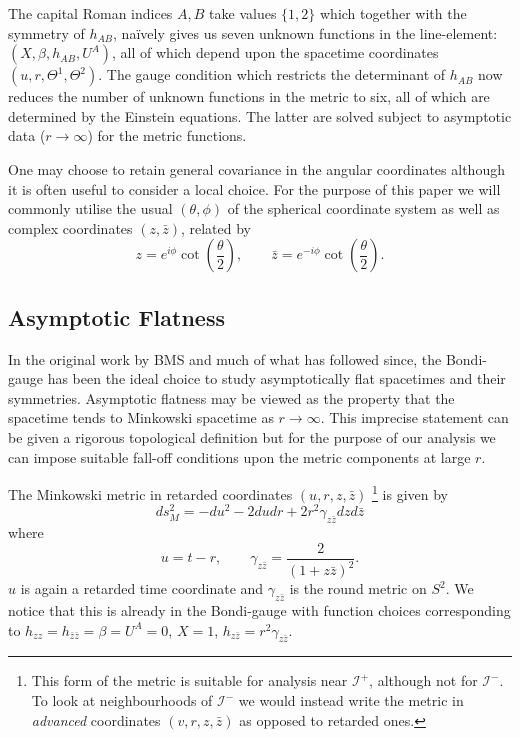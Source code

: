 \documentclass[a4paper,11pt]{article}
\numberwithin{equation}{section}
\begin{document}
The capital Roman indices $A,B$ take values $\{1,2\}$ which together with the symmetry of $h_{AB}$, na\"{i}vely gives us seven unknown functions in the line-element: $(X, \beta, h_{AB}, U^A)$, all of which depend upon the spacetime coordinates $(u, r, \Theta^1, \Theta^2)$. The gauge condition which restricts the determinant of $h_{AB}$ now reduces the number of unknown functions in the metric to six, all of which are determined by the Einstein equations. The latter are solved subject to asymptotic data ($ r \rightarrow \infty$) for the metric functions.  

One may choose to retain general covariance in the angular coordinates \cite{Flanagan:2015pxa} although it is often useful to consider a local choice. For the purpose of this paper we will commonly utilise the usual $(\theta, \phi)$ of the spherical coordinate system as well as complex coordinates  $(z, \bar{z})$, related by
\begin{equation}
z=e^{i\phi}\cot\left(\frac{\theta}{2}\right), \qquad \bar{z}=e^{-i\phi}\cot\left(\frac{\theta}{2}\right).
\end{equation}

\subsection{Asymptotic Flatness}

In the original work by BMS and much of what has followed since, the Bondi-gauge has been the ideal choice to study asymptotically flat spacetimes and their symmetries. Asymptotic flatness may be viewed as the property that the spacetime tends to Minkowski spacetime as $r \rightarrow \infty$. This imprecise statement can be given a rigorous topological definition \cite{Wald:1984rg, Hawking:1973uf} but for the purpose of our analysis we can impose suitable fall-off conditions upon the metric components at large $r$. 

The Minkowski metric in retarded coordinates $(u,r,z,\bar{z})$ \footnote{This form of the metric is suitable for analysis near $\mathscr{I^+}$, although not for $\mathscr{I^-}$. To look at neighbourhoods of $\mathscr{I^-}$ we would instead write the metric in \textit{advanced} coordinates $(v,r,z,\bar{z})$ as opposed to retarded ones.} is given by 
\begin{equation}
ds_{M}^2=-du^2-2dudr+2r^2\gamma_{z \bar{z}}dzd\bar{z}
\end{equation} 
where 
\begin{equation}
u=t-r , \qquad \gamma_{z \bar{z}}=\frac{2}{(1+z\bar{z})^2}.
\end{equation}
$u$ is again a retarded time coordinate and $\gamma_{z\bar{z}}$ is the round metric on $S^2$. We notice that this is already in the Bondi-gauge with function choices corresponding to $h_{zz}=h_{\bar{z} \bar{z}}= \beta= U^A=0$, $X=1$, $h_{z \bar{z}}=r^2 \gamma_{z \bar{z}}$. 
\end{document}
